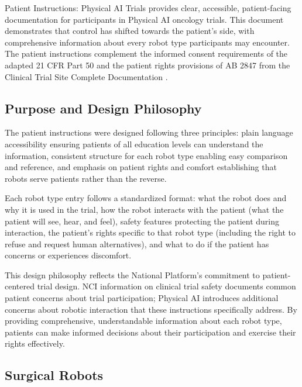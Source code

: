 
Patient Instructions: Physical AI Trials \cite{patient-instructions-paper}
provides clear, accessible, patient-facing documentation for participants in
Physical AI oncology trials. This document demonstrates that control has shifted
towards the patient's side, with comprehensive information about every robot
type participants may encounter. The patient instructions complement the
informed consent requirements of the adapted 21 CFR Part 50 \cite{cfr50-adapt}
and the patient rights provisions of AB 2847 from the Clinical Trial Site
Complete Documentation \cite{site-docs}.

\subsection{Purpose and Design Philosophy}
\label{subsec:instructions-purpose}

The patient instructions were designed following three principles: plain
language accessibility ensuring patients of all education levels can understand
the information, consistent structure for each robot type enabling easy
comparison and reference, and emphasis on patient rights and comfort
establishing that robots serve patients rather than the reverse.

Each robot type entry follows a standardized format: what the robot does and
why it is used in the trial, how the robot interacts with the patient (what
the patient will see, hear, and feel), safety features protecting the patient
during interaction, the patient's rights specific to that robot type (including
the right to refuse and request human alternatives), and what to do if the
patient has concerns or experiences discomfort.

This design philosophy reflects the National Platform's commitment to
patient-centered trial design. NCI information on clinical trial safety
\cite{nci-trials-safety} documents common patient concerns about trial
participation; Physical AI introduces additional concerns about robotic
interaction that these instructions specifically address. By providing
comprehensive, understandable information about each robot type, patients can
make informed decisions about their participation and exercise their rights
effectively.

\subsection{Surgical Robots}
\label{subsec:instructions-surgical}

